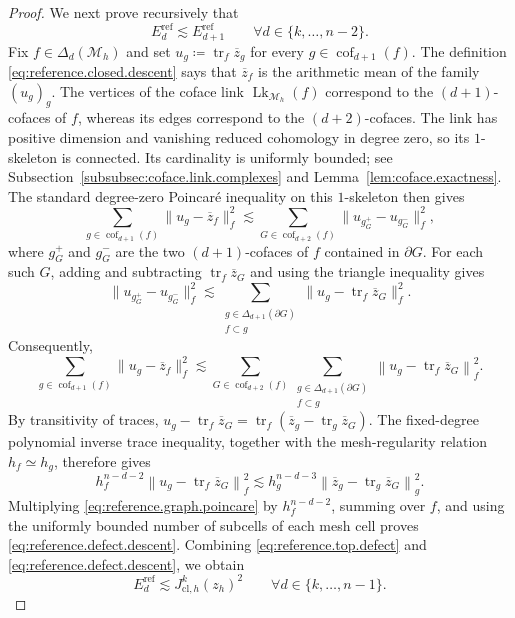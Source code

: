 \documentclass[a4paper,11pt]{article}
\theoremstyle{definition}
\newcommand{\Mh}{\mathcal{M}_h}
\newcommand{\FM}[1]{\Delta_{#1}}
\newcommand{\cof}[1]{\operatorname{cof}_{#1}}
\newcommand{\trc}{\operatorname{tr}}
\begin{document}
\begin{proof}
We next prove recursively that
\begin{equation}
\label{eq:reference.defect.descent}
  E_d^{\mathrm{ref}}
  \lesssim
  E_{d+1}^{\mathrm{ref}}
  \qquad
  \forall d\in\{k,\ldots,n-2\}.
\end{equation}
Fix $f\in\FM{d}(\Mh)$ and set $u_g\coloneqq\trc_f\overline z_g$ for every $g\in\cof{d+1}(f)$.
The definition \eqref{eq:reference.closed.descent} says that $\overline z_f$ is the arithmetic mean of the family $(u_g)_g$.
The vertices of the coface link $\operatorname{Lk}_{\Mh}(f)$ correspond to the $(d+1)$-cofaces of $f$, whereas its edges correspond to the $(d+2)$-cofaces.
The link has positive dimension and vanishing reduced cohomology in degree zero, so its $1$-skeleton is connected.
Its cardinality is uniformly bounded; see Subsection~\ref{subsubsec:coface.link.complexes} and Lemma~\ref{lem:coface.exactness}.
The standard degree-zero Poincar\'e inequality on this $1$-skeleton then gives
\[
  \sum_{g\in\cof{d+1}(f)}
  \|u_g-\overline z_f\|_f^2
  \lesssim
  \sum_{G\in\cof{d+2}(f)}
  \|u_{g_G^+}-u_{g_G^-}\|_f^2,
\]
where $g_G^+$ and $g_G^-$ are the two $(d+1)$-cofaces of $f$
contained in $\partial G$.
For each such $G$, adding and subtracting $\trc_f\overline z_G$ and using the triangle inequality gives
\[
  \|u_{g_G^+}-u_{g_G^-}\|_f^2
  \lesssim
  \sum_{\substack{
    g\in\FM{d+1}(\partial G)\\
    f\subset g
  }}
  \|u_g-\trc_f\overline z_G\|_f^2.
\]
Consequently,
\begin{equation}
\label{eq:reference.graph.poincare}
  \sum_{g\in\cof{d+1}(f)}
  \|u_g-\overline z_f\|_f^2
  \lesssim
  \sum_{G\in\cof{d+2}(f)}
  \sum_{\substack{
    g\in\FM{d+1}(\partial G)\\
    f\subset g
  }}
  \left\|
    u_g-\trc_f\overline z_G
  \right\|_f^2.
\end{equation}
By transitivity of traces, $u_g-\trc_f\overline z_G=\trc_f(\overline z_g-\trc_g\overline z_G)$.
The fixed-degree polynomial inverse trace inequality, together with the mesh-regularity relation $h_f\simeq h_g$, therefore gives
\[
  h_f^{n-d-2}
  \left\|
    u_g-\trc_f\overline z_G
  \right\|_f^2
  \lesssim
  h_g^{n-d-3}
  \left\|
    \overline z_g-\trc_g\overline z_G
  \right\|_g^2.
\]
Multiplying \eqref{eq:reference.graph.poincare} by $h_f^{n-d-2}$, summing over $f$, and using the uniformly bounded number of subcells of each mesh cell proves \eqref{eq:reference.defect.descent}.
Combining \eqref{eq:reference.top.defect} and \eqref{eq:reference.defect.descent}, we obtain
\begin{equation}
\label{eq:reference.all.defects}
  E_d^{\mathrm{ref}}
  \lesssim
  J_{\mathrm{cl},h}^k(z_h)^2
  \qquad
  \forall d\in\{k,\ldots,n-1\}.
\end{equation}


\end{proof}
\end{document}
